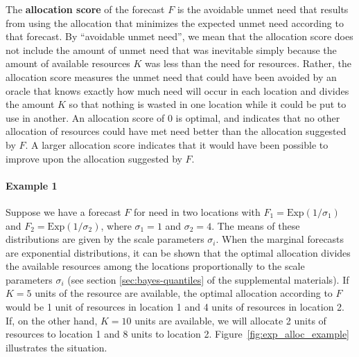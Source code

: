 \documentclass{article}\usepackage[]{graphicx}\usepackage[]{xcolor}
\begin{document}
The \textbf{allocation score} of the forecast $F$ is the avoidable unmet need that results from using the allocation that minimizes the expected unmet need according to that forecast.
By ``avoidable unmet need'', we mean that the allocation score does not include the amount of unmet need that was inevitable simply because the amount of available resources $K$ was less than the need for resources.
Rather, the allocation score measures the unmet need that could have been avoided by an oracle that knows exactly how much need will occur in each location and divides the amount $K$ so that nothing is wasted in one location while it could be put to use in another. An allocation score of 0 is optimal, and indicates that no other allocation of resources could have met need better than the allocation suggested by $F$. A larger allocation score indicates that it would have been possible to improve upon the allocation suggested by $F$.

\paragraph{Example 1} Suppose we have a forecast $F$ for need in two locations with $F_1 = \mathrm{Exp}(1 / \sigma_1)$ and $F_2 = \mathrm{Exp}(1 / \sigma_2)$, where $\sigma_1 = 1$ and $\sigma_2 = 4$. The means of these distributions are given by the scale parameters $\sigma_i$. When the marginal forecasts are exponential distributions, it can be shown that the optimal allocation divides the available resources among the locations proportionally to the scale parameters $\sigma_i$ (see section
\ref{sec:bayes-quantiles} of the supplemental materials). If $K = 5$ units of the resource are available, the optimal allocation according to $F$ would be 1 unit of resources in location 1 and 4 units of resources in location 2. If, on the other hand, $K = 10$ units are available, we will allocate 2 units of resources to location 1 and 8 units to location 2. Figure~\ref{fig:exp_alloc_example} illustrates the situation.
\end{document}
